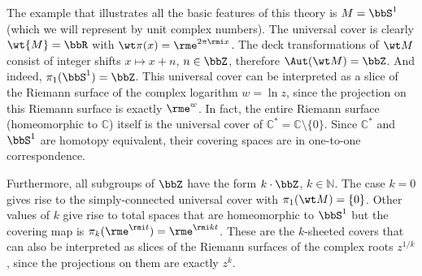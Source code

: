 \begin{example}
    The example that illustrates all the basic features of this theory is $M=\bbS^1$ (which we will represent by unit complex numbers). The universal cover is clearly $\wt{M}=\bbR $ with $\wt\pi(x)=\rme^{2\pi\rmi x}$. The deck transformations of $\wt M$ consist of integer shifts $x\mapsto x+n$, $n\in \bbZ$, therefore $\Aut(\wt M)=\bbZ$. And indeed, $\pi_1(\bbS^1)=\bbZ$. This universal cover can be interpreted as a slice of the Riemann surface of the complex logarithm $w=\ln z$, since the projection on this Riemann surface is exactly $\rme^w$. In fact, the entire Riemann surface (homeomorphic to $\mathbb{C}$) itself is the universal cover of $\mathbb{C}^\ast=\mathbb{C}\setminus\{0\}$. Since $\mathbb{C}^\ast$ and $\bbS^1$ are homotopy equivalent, their covering spaces are in one-to-one correspondence.

    Furthermore, all subgroups of $\bbZ$ have the form $k\cdot \bbZ$, $k\in\mathbb{N}$. The case $k=0$ gives rise to the simply-connected universal cover with $\pi_1(\wt M)=\{0\}$. Other values of $k$ give rise to total spaces that are homeomorphic to $\bbS^1$ but the covering map is $\pi_k(\rme^{\rmi t})=\rme^{\rmi kt}$. These are the $k$-sheeted covers that can also be interpreted as slices of the Riemann surfaces of the complex roots $z^{1/k}$, since the projections on them are exactly $z^k$.
\end{example}

